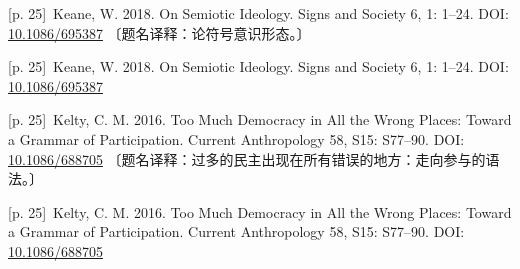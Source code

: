 \documentclass[10pt,a4paper]{article}
\begin{document}
\noindent\begin{minipage}{\textwidth}\begin{minipage}[t]{\dimexpr.5\textwidth-4mm\relax}\noindent\begin{minipage}[t]{\linewidth}{\scriptsize\color{gray} [p. 25]}\ Keane, W. 2018. On Semiotic Ideology. Signs and Society 6, 1: 1–24. DOI: \url{10.1086/695387} 〔题名译释：论符号意识形态。〕\par\end{minipage}\par\end{minipage}\hfill\begin{minipage}[t]{\dimexpr.5\textwidth-4mm\relax}\noindent\begin{minipage}[t]{\linewidth}{\scriptsize\color{gray} [p. 25]}\ Keane, W. 2018. On Semiotic Ideology. Signs and Society 6, 1: 1–24. DOI: \url{10.1086/695387}\par\end{minipage}\par\end{minipage}\end{minipage}\par
\noindent\begin{minipage}{\textwidth}\begin{minipage}[t]{\dimexpr.5\textwidth-4mm\relax}\noindent\begin{minipage}[t]{\linewidth}{\scriptsize\color{gray} [p. 25]}\ Kelty, C. M. 2016. Too Much Democracy in All the Wrong Places: Toward a Grammar of Participation. Current Anthropology 58, S15: S77–90. DOI: \url{10.1086/688705} 〔题名译释：过多的民主出现在所有错误的地方：走向参与的语法。〕\par\end{minipage}\par\end{minipage}\hfill\begin{minipage}[t]{\dimexpr.5\textwidth-4mm\relax}\noindent\begin{minipage}[t]{\linewidth}{\scriptsize\color{gray} [p. 25]}\ Kelty, C. M. 2016. Too Much Democracy in All the Wrong Places: Toward a Grammar of Participation. Current Anthropology 58, S15: S77–90. DOI: \url{10.1086/688705}\par\end{minipage}\par\end{minipage}\end{minipage}\par
\end{document}
